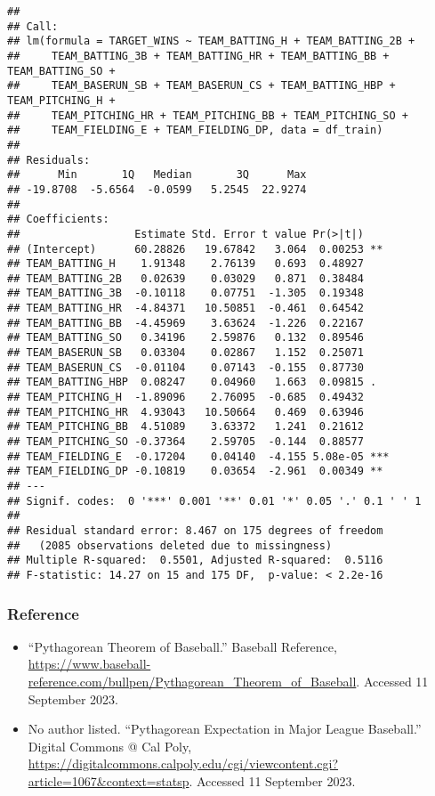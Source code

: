 \documentclass[
]{article}
\providecommand{\tightlist}{%
  \setlength{\itemsep}{0pt}\setlength{\parskip}{0pt}}
\begin{document}
\begin{verbatim}
## 
## Call:
## lm(formula = TARGET_WINS ~ TEAM_BATTING_H + TEAM_BATTING_2B + 
##     TEAM_BATTING_3B + TEAM_BATTING_HR + TEAM_BATTING_BB + TEAM_BATTING_SO + 
##     TEAM_BASERUN_SB + TEAM_BASERUN_CS + TEAM_BATTING_HBP + TEAM_PITCHING_H + 
##     TEAM_PITCHING_HR + TEAM_PITCHING_BB + TEAM_PITCHING_SO + 
##     TEAM_FIELDING_E + TEAM_FIELDING_DP, data = df_train)
## 
## Residuals:
##      Min       1Q   Median       3Q      Max 
## -19.8708  -5.6564  -0.0599   5.2545  22.9274 
## 
## Coefficients:
##                  Estimate Std. Error t value Pr(>|t|)    
## (Intercept)      60.28826   19.67842   3.064  0.00253 ** 
## TEAM_BATTING_H    1.91348    2.76139   0.693  0.48927    
## TEAM_BATTING_2B   0.02639    0.03029   0.871  0.38484    
## TEAM_BATTING_3B  -0.10118    0.07751  -1.305  0.19348    
## TEAM_BATTING_HR  -4.84371   10.50851  -0.461  0.64542    
## TEAM_BATTING_BB  -4.45969    3.63624  -1.226  0.22167    
## TEAM_BATTING_SO   0.34196    2.59876   0.132  0.89546    
## TEAM_BASERUN_SB   0.03304    0.02867   1.152  0.25071    
## TEAM_BASERUN_CS  -0.01104    0.07143  -0.155  0.87730    
## TEAM_BATTING_HBP  0.08247    0.04960   1.663  0.09815 .  
## TEAM_PITCHING_H  -1.89096    2.76095  -0.685  0.49432    
## TEAM_PITCHING_HR  4.93043   10.50664   0.469  0.63946    
## TEAM_PITCHING_BB  4.51089    3.63372   1.241  0.21612    
## TEAM_PITCHING_SO -0.37364    2.59705  -0.144  0.88577    
## TEAM_FIELDING_E  -0.17204    0.04140  -4.155 5.08e-05 ***
## TEAM_FIELDING_DP -0.10819    0.03654  -2.961  0.00349 ** 
## ---
## Signif. codes:  0 '***' 0.001 '**' 0.01 '*' 0.05 '.' 0.1 ' ' 1
## 
## Residual standard error: 8.467 on 175 degrees of freedom
##   (2085 observations deleted due to missingness)
## Multiple R-squared:  0.5501, Adjusted R-squared:  0.5116 
## F-statistic: 14.27 on 15 and 175 DF,  p-value: < 2.2e-16
\end{verbatim}

\hypertarget{reference}{%
\subsubsection{Reference}\label{reference}}

\begin{itemize}
\tightlist
\item
  ``Pythagorean Theorem of Baseball.'' Baseball Reference,
  \url{https://www.baseball-reference.com/bullpen/Pythagorean_Theorem_of_Baseball}.
  Accessed 11 September 2023.
\item
  No author listed. ``Pythagorean Expectation in Major League
  Baseball.'' Digital Commons @ Cal Poly,
  \url{https://digitalcommons.calpoly.edu/cgi/viewcontent.cgi?article=1067\&context=statsp}.
  Accessed 11 September 2023.
\end{itemize}
\end{document}
